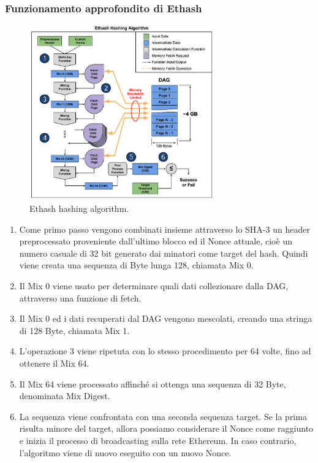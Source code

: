 \documentclass[a4paper,11pt]{report}
\begin{document}
\subsubsection{Funzionamento approfondito di Ethash}
\begin{figure}[htbp] 
\begin{center}
\includegraphics[width=8cm]{img/ethash.jpg}
\end{center}
\caption{Ethash hashing algorithm. \cite{etlash}}
\end{figure}
\begin{enumerate}
\item Come primo passo vengono combinati insieme attraverso lo SHA-3 un header preprocessato proveniente dall'ultimo blocco ed il Nonce attuale, cioè un numero casuale di 32 bit generato dai minatori come target del hash. Quindi viene creata una sequenza di Byte lunga 128, chiamata Mix 0.
\item Il Mix 0 viene usato per determinare quali dati collezionare dalla DAG, attraverso una funzione di fetch.
\item Il Mix 0 ed i dati recuperati dal DAG vengono mescolati, creando una stringa di 128 Byte, chiamata Mix 1.
\item  L'operazione 3 viene ripetuta con lo stesso procedimento per 64 volte, fino ad ottenere il Mix 64.
\item Il Mix 64 viene processato affinché si ottenga una sequenza di 32 Byte, denominata Mix Digest.
\item La sequenza viene confrontata con una seconda sequenza target. Se la prima risulta minore del target, allora possiamo considerare il Nonce come raggiunto e inizia il processo di broadcasting sulla rete Ethereum. In caso contrario, l'algoritmo viene di nuovo eseguito con un nuovo Nonce.
\end{enumerate}
\end{document}
